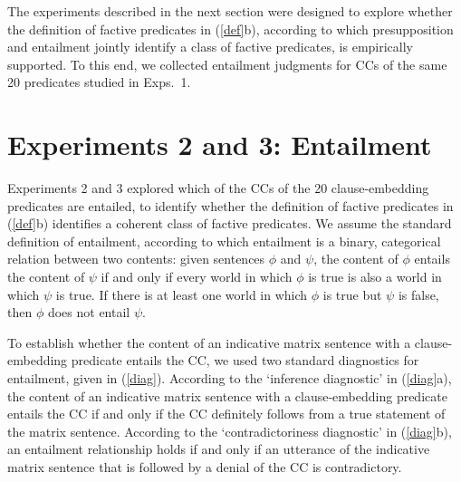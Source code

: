 \documentclass[11pt,fleqn]{article}
\newcommand{\6}{\mbox{$[\hspace*{-.6mm}[$}}
\newcommand{\9}{\mbox{$]\hspace*{-.6mm}]$}}
\begin{document}
The experiments described in the next section were designed to explore whether the definition of factive predicates in (\ref{def}b), according to which presupposition and entailment jointly identify a class of factive predicates, is empirically supported. To this end, we collected entailment judgments for CCs of the same 20 predicates studied in Exps.~1.

\section{Experiments 2 and 3: Entailment}\label{s3}

Experiments 2 and 3 explored which of the CCs of the 20 clause-embedding predicates are entailed, to identify whether the definition of factive predicates in (\ref{def}b) identifies a coherent class of factive predicates. We assume the standard definition of entailment, according to which entailment is a binary, categorical relation between two contents: given sentences $\phi$ and $\psi$, the content of $\phi$ entails the content of $\psi$ if and only if every world in which $\phi$ is true is also a world in which $\psi$ is true. If there is at least one world in which $\phi$ is true but $\psi$ is false, then $\phi$ does not entail $\psi$. 

To establish whether the content of an indicative matrix sentence with a clause-embedding predicate entails the CC, we used two standard diagnostics for entailment, given in (\ref{diag}). According to the `inference diagnostic' in (\ref{diag}a), the content of an indicative matrix sentence with a clause-embedding predicate entails the CC if and only if the CC definitely follows from a true statement of the matrix sentence. According to the `contradictoriness diagnostic' in (\ref{diag}b), an entailment relationship holds if and only if an utterance of the indicative matrix sentence that is followed by a denial of the CC is contradictory. 
\end{document}

